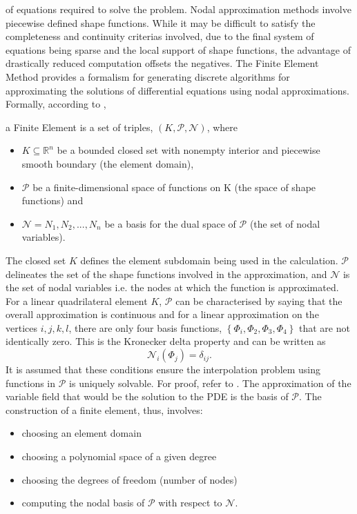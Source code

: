  of equations required to solve the problem. Nodal approximation methods involve piecewise defined shape functions. While it may be difficult to satisfy the
 completeness and continuity criterias involved, due to the final system of equations being sparse and the local support of shape functions,
 the advantage of drastically reduced computation offsets the negatives. The Finite Element Method provides a formalism for generating discrete algorithms for approximating
 the solutions of differential equations using nodal approximations. 
 Formally, according to \cite{ciarlet1978finite}, 
\begin{definition}
    a Finite Element is a set of triples, $(K, \mathcal{P}, \mathcal{N})$, where
    \begin{itemize}
        \item $K \subseteq \mathbb{R}^{n}$ be a bounded closed set with nonempty interior and piecewise smooth boundary (the element domain),
        \item $\mathcal{P}$ be a finite-dimensional space of functions on K (the space of shape functions) and
        \item $\mathcal{N} = {N_{1}, N_{2},...,N_{n}}$ be a basis for the dual space of $\mathcal{P}$ (the set of nodal variables).
    \end{itemize}
\end{definition}
%
The closed set $K$ defines the element subdomain being used in the calculation. $\mathcal{P}$ delineates the set of
 the shape functions involved in the approximation, and $\mathcal{N}$ is the set of nodal variables i.e. the nodes at
 which the function is approximated. For a linear quadrilateral element $K$, $\mathcal{P}$ can be characterised by saying
 that the overall approximation is continuous and for a linear approximation on the vertices $i, j, k, l$,
 there are only four basis functions, $\left\{\Phi_{i}, \Phi_{2}, \Phi_{3}, \Phi_{4} \right\}$ that are not identically zero.
 This is the Kronecker delta property and can be written as
 \begin{equation}
    \mathcal{N}_{i}(\Phi_{j}) = \delta_{ij}.
 \end{equation}
It is assumed that these conditions ensure the interpolation problem using functions in $\mathcal{P}$ is uniquely solvable.
 For proof, refer to \cite{brenner2002}. The approximation of the variable field that would be the solution to the PDE is the basis of $\mathcal{P}$.
 The construction of a finite element, thus, involves:
 \begin{itemize}
    \item choosing an element domain
    \item choosing a polynomial space of a given degree
    \item choosing the degrees of freedom (number of nodes)
    \item computing the nodal basis of $\mathcal{P}$ with respect to $\mathcal{N}$.
 \end{itemize}

